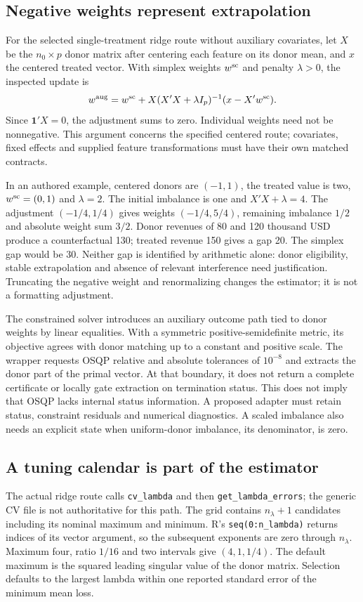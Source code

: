 \subsection{Negative weights represent extrapolation}
For the selected single-treatment ridge route without auxiliary covariates,
let $X$ be the $n_0\times p$ donor matrix after centering each feature on its
donor mean, and $x$ the centered treated vector. With simplex weights
$w^{\rm sc}$ and penalty $\lambda>0$, the inspected update is
\[
 w^{\rm aug}=w^{\rm sc}
   +X(X'X+\lambda I_p)^{-1}(x-X'w^{\rm sc}).
\]
Since $\mathbf{1}'X=0$, the adjustment sums to zero. Individual weights
need not be nonnegative. This argument concerns the specified centered
route; covariates, fixed effects and supplied feature transformations must
have their own matched contracts.~\citep{exec24_augsynth_source,exec24_augsynth_choice}

In an authored example, centered donors are $(-1,1)$, the treated value is
two, $w^{\rm sc}=(0,1)$ and $\lambda=2$. The initial imbalance is one and
$X'X+\lambda=4$. The adjustment $(-1/4,1/4)$ gives weights $(-1/4,5/4)$,
remaining imbalance $1/2$ and absolute weight sum $3/2$. Donor revenues of
80 and 120 thousand USD produce a counterfactual 130; treated revenue 150
gives a gap 20. The simplex gap would be 30. Neither gap is identified by
arithmetic alone: donor eligibility, stable extrapolation and absence of
relevant interference need justification. Truncating the negative weight
and renormalizing changes the estimator; it is not a formatting adjustment.
\citep{exec24_augsynth_choice}

The constrained solver introduces an auxiliary outcome path tied to donor
weights by linear equalities. With a symmetric positive-semidefinite metric,
its objective agrees with donor matching up to a constant and positive
scale. The wrapper requests OSQP relative and absolute tolerances of
$10^{-8}$ and extracts the donor part of the primal vector. At that boundary,
it does not return a complete certificate or locally gate extraction on
termination status. This does not imply that OSQP lacks internal status
information. A proposed adapter must retain status, constraint residuals
and numerical diagnostics. A scaled imbalance also needs an explicit state
when uniform-donor imbalance, its denominator, is zero.
\citep{exec24_augsynth_source}

\subsection{A tuning calendar is part of the estimator}
The actual ridge route calls \texttt{cv\_lambda} and then
\texttt{get\_lambda\_errors}; the generic CV file is not authoritative for
this path. The grid contains $n_\lambda+1$ candidates including its nominal
maximum and minimum. R's \texttt{seq(0:n\_lambda)} returns indices of its
vector argument, so the subsequent exponents are zero through $n_\lambda$.
Maximum four, ratio $1/16$ and two intervals give $(4,1,1/4)$.
The default maximum is the squared leading singular value of the donor
matrix. Selection defaults to the largest lambda within one reported
standard error of the minimum mean loss.
\citep{exec24_augsynth_source,exec24_augsynth_choice}


